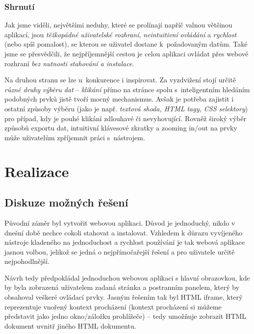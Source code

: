 \documentclass[thesis=B,czech]{FITthesis2}[2012/06/26]
\begin{document}
	\subsection{Shrnutí}
	Jak jsme viděli, největšími neduhy, které se prolínají napříč valnou většinou aplikací, jsou \emph{těžkopádné uživatelské rozhraní}, \emph{neintuitivní ovládání} a \emph{rychlost} (nebo spíš pomalost), se kterou se uživatel dostane k~požadovaným datům. Také jsme se přesvědčili, že nejpříjemnější cestou je celou aplikaci ovládat přes webové rozhraní  \emph{bez nutnosti stahování a instalace}.
	
	Na druhou stranu se lze u~konkurence i inspirovat. Za vyzdvižení stojí určitě \emph{různé druhy výběru dat} -- \emph{klikání} přímo na stránce spolu s~inteligentním hledáním podobných prvků jistě tvoří mocný mechanismus. Avšak je potřeba zajistit i ostatní způsoby výběru (jako je např. \emph{textová shoda, HTML tagy, CSS selektory}) pro případ, kdy je pouhé klikání zdlouhavé či nevyhovující. Rovněž široký výběr způsobů exportu dat, intuitivní klávesové zkratky a zooming in/out na prvky může uživatelům zpříjemnit práci s~nástrojem.
	
	
	
	\chapter{Realizace}
	
	\section{Diskuze možných řešení}
	Původní záměr byl vytvořit webovou aplikaci. Důvod je jednoduchý, nikdo v dnešní době nechce cokoli stahovat a instalovat. Vzhledem k důrazu vyvíjeného nástroje kladeného na jednoduchost a rychlost používání je tak webová aplikace jasnou volbou, jelikož se jedná o nejpřímočařejší řešení a pro uživatele určitě nejpohodlnější.
	
	Návrh tedy předpokládal jednoduchou webovou aplikaci s hlavní obrazovkou, kde by byla zobrazená uživatelem zadaná stránka a postranním panelem, který by obsahoval veškeré ovládací prvky. Jasným řešením tak byl HTML iframe, který reprezentuje vnořený kontext procházení (kontext procházení si můžeme představit jako jedno okno/záložku prohlížeče) -- tedy umožňuje zobrazit HTML dokument uvnitř jiného HTML dokumentu.
	
\end{document}
